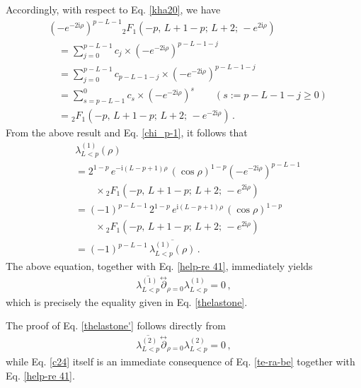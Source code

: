 \documentclass[aps,twocolumn,nofootinbib]{revtex4}
\begin{document}
{\begin{appendix}
Accordingly, with respect to Eq. \eqref{kha20}, we have
\begin{align}\label{hyper-kha}
    & \left(-e^{-2\mathrm{i}\rho}\right)^{p-L-1}{}_2F_1^{}\left(-p,\,L+1-p;\,L+2;\,-e^{2\mathrm{i}\rho}\right) \nonumber\\[3pt]
    &\quad = \sum_{j=0}^{p-L-1} c_j \times \left(-e^{-2\mathrm{i}\rho}\right)^{p-L-1-j} \nonumber\\[3pt]
    &\quad = \sum_{j=0}^{p-L-1} c_{p-L-1-j} \times \left(-e^{-2\mathrm{i}\rho}\right)^{p-L-1-j} \nonumber\\[3pt]
    &\quad = \sum_{s=p-L-1}^0 c_{s} \times \left(-e^{-2\mathrm{i}\rho}\right)^{s} \quad\quad (s:=p-L-1-j \geqslant 0)\nonumber\\[3pt]
    &\quad = {}_2F_1^{} \left(-p,\,L+1-p;\,L+2;\,-e^{-2\mathrm{i}\rho}\right) \,.
\end{align}
From the above result and Eq. \eqref{chi_p-1}, it follows that
\begin{align}\label{lambda1-kha}
    &\lambda_{L<p}^{(1)}(\rho) \nonumber\\[3pt]
    &= 2^{1-p}\, e^{-\mathrm{i}(L-p+1)\rho}\, (\cos\rho)^{1-p}\left(-e^{-2\mathrm{i}\rho}\right)^{p-L-1} \nonumber\\[3pt]
    &\qquad \times {}_2F_1^{}\left(-p,\,L+1-p;\,L+2;\,-e^{2\mathrm{i}\rho}\right) \nonumber\\[3pt]
    & = (-1)^{p-L-1}\, 2^{1-p}\, e^{\mathrm{i}(L-p+1)\rho}\, (\cos\rho)^{1-p} \nonumber\\[3pt]
    &\qquad\times {}_2F_1^{} \left(-p,\,L+1-p;\,L+2;\,-e^{2\mathrm{i}\rho}\right) \nonumber\\[3pt]
    & = (-1)^{p-L-1}\, \overline{\lambda_{L<p}^{(1)}(\rho)} \,.
\end{align}
The above equation, together with Eq. \eqref{help-re 41}, immediately yields
\begin{align}\label{mar-mar}
    \overline{\lambda^{(1)}_{L<p}} \stackrel{\leftrightarrow}{\partial}_{\rho=0}\lambda^{(1)}_{L<p} = 0 \,, 
\end{align}
which is precisely the equality given in Eq. \eqref{thelastone}.

The proof of Eq. \eqref{thelastone'} follows directly from
\begin{align}\label{c24}
    \overline{\lambda_{L<p}^{(2)}} \stackrel{\leftrightarrow}{\partial}_{\rho=0} \lambda_{L<p}^{(2)} = 0 \,,
\end{align}
while Eq. \eqref{c24} itself is an immediate consequence of Eq. \eqref{te-ra-be} together with Eq. \eqref{help-re 41}.


\end{appendix}}
\end{document}

